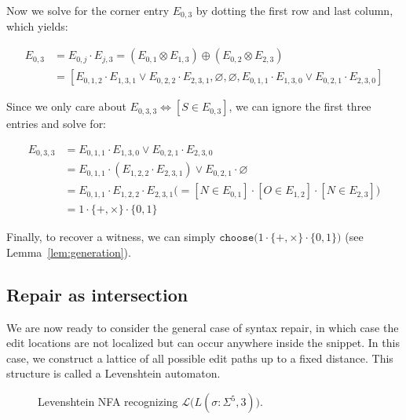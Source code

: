 \documentclass[popl.tex]{subfiles}
\begin{document}
\noindent Now we solve for the corner entry $E_{0, 3}$ by dotting the first row and last column, which yields:\vspace{-8pt}

\begin{align*}
  E_{0, 3} &= E_{0, j} \cdot E_{j, 3} = (E_{0, 1} \otimes E_{1, 3}) \oplus (E_{0, 2} \otimes E_{2, 3})\\
  &= [E_{0, 1, 2} \cdot E_{1, 3, 1} \lor E_{0, 2, 2} \cdot E_{2, 3, 1}, \varnothing, \varnothing, E_{0, 1, 1} \cdot E_{1, 3, 0} \lor E_{0, 2, 1} \cdot E_{2, 3, 0}]
\end{align*}

\noindent Since we only care about $E_{0, 3, 3} \Leftrightarrow [S \in E_{0, 3}]$, we can ignore the first three entries and solve for:\vspace{-8pt}

\begin{align*}
  E_{0, 3, 3} &= E_{0, 1, 1} \cdot E_{1, 3, 0} \lor E_{0, 2, 1} \cdot E_{2, 3, 0}\\
  &= E_{0, 1, 1} \cdot (E_{1, 2, 2} \cdot E_{2, 3, 1}) \lor E_{0, 2, 1} \cdot \varnothing\\
  &= E_{0, 1, 1} \cdot E_{1, 2, 2} \cdot E_{2, 3, 1} \big(= [N \in E_{0, 1}] \cdot [O \in E_{1, 2}] \cdot [N \in E_{2, 3}]\big)\\
  &= 1 \cdot \{+, \times\} \cdot \{0, 1\}
\end{align*}

\noindent Finally, to recover a witness, we can simply $\texttt{choose}\big(1 \cdot \{+, \times\} \cdot \{0, 1\}\big)$  (see Lemma~\ref{lem:generation}).

\subsection{Repair as intersection}\label{sec:repair_ex}

We are now ready to consider the general case of syntax repair, in which case the edit locations are not localized but can occur anywhere inside the snippet. In this case, we construct a lattice of all possible edit paths up to a fixed distance. This structure is called a Levenshtein automaton.

\begin{figure}
  \vspace{-0.3cm}
  \begin{center}
    
  \end{center}
  \caption{Levenshtein NFA recognizing $\mathcal{L}\big(L(\sigma: \Sigma^5, 3)\big)$.}\label{fig:lev_nfa}
  \vspace{-0.5cm}
\end{figure}
\end{document}
